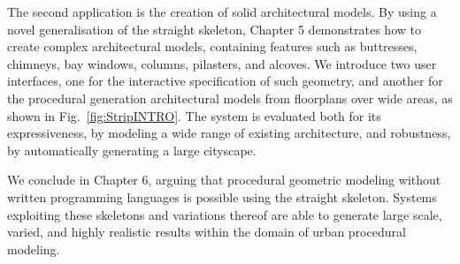 The second application is the creation of solid architectural models. By using a novel generalisation of the straight skeleton, Chapter 5 demonstrates how to create complex architectural models, containing features such as buttresses, chimneys, bay windows, columns, pilasters, and alcoves. We introduce two user interfaces, one for the interactive specification of such geometry, and another for the procedural generation architectural models from floorplans over wide areas, as shown in Fig.~\ref{fig:StripINTRO}. The system is evaluated both for its expressiveness, by modeling a wide range of existing architecture, and robustness, by automatically generating a large cityscape.

We conclude in Chapter 6, arguing that procedural geometric modeling without written programming languages is possible using the straight skeleton. Systems exploiting these skeletons and variations thereof are able to generate large scale, varied, and highly realistic results within the domain of urban procedural modeling.

